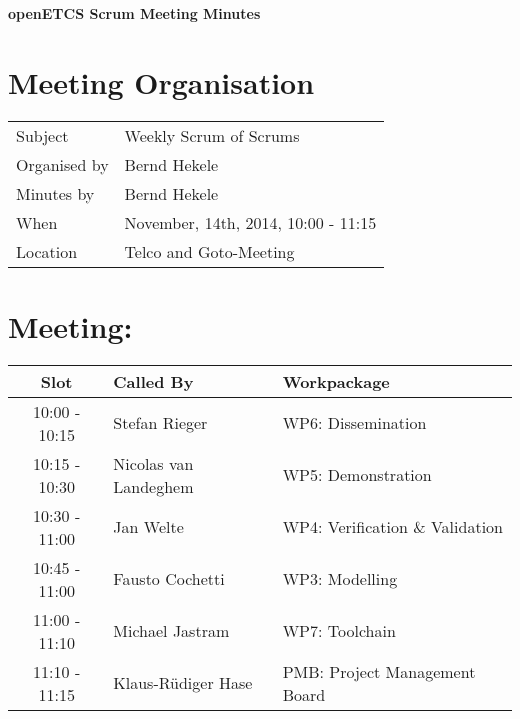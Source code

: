 \documentclass[a4paper, 11pt]{article}
\begin{document}
{\begin{center}\huge\bf openETCS Scrum Meeting Minutes\end{center}}
\section{Meeting Organisation}

\renewcommand{\arraystretch}{1.5}
\begin{supertabular}{m{.2\textwidth}m{.8\textwidth}}
Subject & Weekly Scrum of Scrums\\
Organised by &Bernd Hekele\\
Minutes by & Bernd Hekele\\
When & November, 14th, 2014, 10:00 - 11:15\\
Location & Telco and Goto-Meeting\\
\end{supertabular}

\renewcommand{\arraystretch}{1.0}
\section{Meeting:}

\begin{tabular}{|c|l|l|}
\hline
\textbf{Slot} &  \textbf{Called By} & \textbf{Workpackage} \\
\hline  
10:00 - 10:15 & Stefan Rieger & WP6: Dissemination \\\hline  
10:15 - 10:30 & Nicolas van Landeghem & WP5: Demonstration \\\hline  
10:30 - 11:00 & Jan Welte & WP4: Verification \& Validation \\\hline  
10:45 - 11:00 & Fausto Cochetti & WP3: Modelling \\\hline  
11:00 - 11:10 & Michael Jastram & WP7: Toolchain \\\hline
11:10 - 11:15 & Klaus-R\"udiger Hase & PMB: Project Management Board \\\hline  
\end{tabular}
\end{document}
